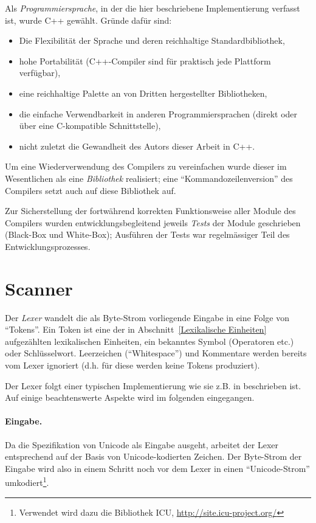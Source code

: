 \documentclass[twoside,a4paper,fleqn,12pt]{book}
\begin{document}
Als \emph{Programmiersprache}, in der die hier beschriebene Implementierung verfasst ist, wurde C++ gewählt.
Gründe dafür sind:
\begin{itemize}
\item Die Flexibilität der Sprache und deren reichhaltige Standardbibliothek,
\item hohe Portabilität (C++-Compiler sind für praktisch jede Plattform verfügbar),
\item eine reichhaltige Palette an von Dritten hergestellter Bibliotheken,
\item die einfache Verwendbarkeit in anderen Programmiersprachen (direkt oder über eine C-kompatible Schnittstelle),
\item nicht zuletzt die Gewandheit des Autors dieser Arbeit in C++.
\end{itemize}
 
Um eine Wiederverwendung des Compilers zu vereinfachen wurde dieser im Wesentlichen als eine \emph{Bibliothek} realisiert;
eine "`Kommandozeilenversion"' des Compilers setzt auch auf diese Bibliothek auf.
 
Zur Sicherstellung der fortwährend korrekten Funktionsweise aller Module des Compilers wurden entwicklungsbegleitend 
jeweils \emph{Tests} der Module geschrieben (Black-Box und White-Box); Ausführen der Tests war regelmässiger Teil des Entwicklungsprozesses.
 
\section{Scanner}

Der \emph{Lexer} wandelt die als Byte-Strom vorliegende Eingabe in eine Folge von "`Tokens"'.
Ein Token ist eine der in Abschnitt~\ref{Lexikalische Einheiten} aufgezählten lexikalischen Einheiten, ein bekanntes Symbol (Operatoren etc.) oder Schlüsselwort. 
Leerzeichen (``Whitespace'') und Kommentare werden bereits vom Lexer ignoriert (d.h. für diese werden keine Tokens produziert).

Der Lexer folgt einer typischen Implementierung wie sie z.B. in \cite{wirth_compiler} beschrieben ist. Auf einige beachtenswerte Aspekte
wird im folgenden eingegangen.

\paragraph{Eingabe.} Da die Spezifikation von Unicode als Eingabe ausgeht, arbeitet der Lexer entsprechend auf der Basis von Unicode-kodierten Zeichen.
Der Byte-Strom der Eingabe wird also in einem Schritt noch vor dem Lexer in einen "`Unicode-Strom"' umkodiert\footnote{Verwendet wird dazu die Bibliothek ICU,
\url{http://site.icu-project.org/}}.
\end{document}
